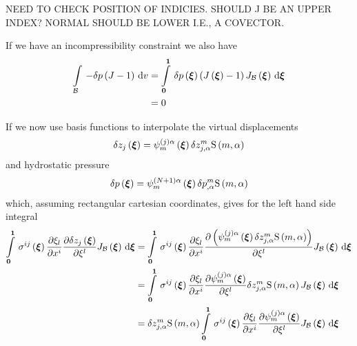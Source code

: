 NEED TO CHECK POSITION OF INDICIES. SHOULD J BE AN UPPER INDEX? NORMAL SHOULD
BE LOWER I.E., A COVECTOR. 

If we have an incompressibility constraint we also have
\begin{equation}
  \begin{split}
    \gint{\embedmanifold{B}}{}{-\variationdir{p}\pbrac{J-1}}{v}&=
    \gint{\vectr{0}}{\vectr{1}}{\variationdir{\fnof{p}{\vectr{\xi}}}\pbrac{
        \fnof{J}{\vectr{\xi}}-1}\fnof{J_{\embedmanifold{B}}}{\vectr{\xi}}}{\vectr{\xi}}\\
    &=0
\  \end{split}
\end{equation}

If we now use basis functions to interpolate the virtual displacements
\begin{equation}
  \variationdir{\fnof{z_{j}}{\vectr{\xi}}} = \idxgbfn{\pbrac{j}}{m}{\alpha}{\vectr{\xi}}\variationdir{z_{j,\alpha}^{m}}\gsf{m}{\alpha}
\end{equation}
and hydrostatic pressure
\begin{equation}
  \variationdir{\fnof{p}{\vectr{\xi}}} = \idxgbfn{\pbrac{N+1}}{m}{\alpha}{\vectr{\xi}}\variationdir{p_{,\alpha}^{m}}\gsf{m}{\alpha}
\end{equation}
which, assuming rectangular cartesian coordinates, gives for the left hand side integral
\begin{equation}
  \begin{split}
    \gint{\vectr{0}}{\vectr{1}}{\fnof{\sigma^{ij}}{\vectr{\xi}}\delby{\xi_{l}}{x^{i}}\delby{\variationdir{
          \fnof{z_{j}}{\vectr{\xi}}}}{\xi^{l}}\fnof{J_{\embedmanifold{B}}}{\vectr{\xi}}}{\vectr{\xi}}
    &= \gint{\vectr{0}}{\vectr{1}}{\fnof{\sigma^{ij}}{\vectr{\xi}}\delby{\xi_{l}}{x^{i}}\delby{
          \pbrac{\idxgbfn{\pbrac{j}}{m}{\alpha}{\vectr{\xi}}\variationdir{z_{j,\alpha}^{m}}\gsf{m}{\alpha}}}{\xi^{l}}
      \fnof{J_{\embedmanifold{B}}}{\vectr{\xi}}}{\vectr{\xi}} \\
    &= \gint{\vectr{0}}{\vectr{1}}{\fnof{\sigma^{ij}}{\vectr{\xi}}\delby{\xi_{l}}{x^{i}}\delby{
          \idxgbfn{\pbrac{j}}{m}{\alpha}{\vectr{\xi}}}{\xi^{l}}\variationdir{z_{j,\alpha}^{m}}\gsf{m}{\alpha}
      \fnof{J_{\embedmanifold{B}}}{\vectr{\xi}}}{\vectr{\xi}} \\
    &= \variationdir{z_{j,\alpha}^{m}}\gsf{m}{\alpha}
    \gint{\vectr{0}}{\vectr{1}}{\fnof{\sigma^{ij}}{\vectr{\xi}}\delby{\xi_{l}}{x^{i}}\delby{
          \idxgbfn{\pbrac{j}}{m}{\alpha}{\vectr{\xi}}}{\xi^{l}}
      \fnof{J_{\embedmanifold{B}}}{\vectr{\xi}}}{\vectr{\xi}} 
  \end{split}
\end{equation}

